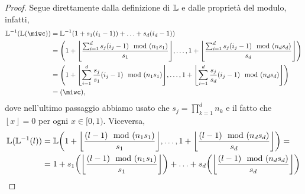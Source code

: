 \begin{proof}
Segue direttamente dalla definizione di $ \mathbb{L} $ e dalle proprietà del modulo, infatti,
\[
\begin{aligned}
  \L^{-1}(\L(\miwc)) &= \L^{-1}(1 + s_1(i_1-1)) + \ldots + s_d(i_d-1)) \\
                     &= \left( 1+ \left\lfloor \frac{\sum_{i=1}^d s_j(i_j-1) \mod(n_1s_1)}{s_1}
                     \right\rfloor, \ldots,   1+ \left\lfloor \frac{\sum_{i=1}^d s_j(i_j-1)
                   \mod(n_ds_d)}{s_d} \right\rfloor \right)\\
                     &= \left( 1+ \left\lfloor \sum_{i=1}^d \frac{s_j}{s_1}(i_j-1) \mod(n_1s_1)
                     \right\rfloor, \ldots,   1+ \left\lfloor \sum_{i=1}^d \frac{s_j}{s_d}(i_j-1)
                   \mod(n_ds_d) \right\rfloor \right)\\
                     &= \left( \miwc \right),
\end{aligned}
\]
dove nell'ultimo passaggio abbiamo usato che $ s_j = \prod_{k=1}^d n_k$ e il fatto che $
\left\lfloor x \right\rfloor = 0 $ per ogni $ x \in [0,1) $.
Viceversa,
\[
\begin{aligned}
  \L(\L^{-1}(l)) &= \L\left(1 + \left\lfloor \frac{ (l-1)\mod(n_1s_1)}{s_1}\right\rfloor, \ldots, 1 +
    \left\lfloor \frac{ (l-1)\mod(n_ds_d)}{s_d} \right\rfloor\right) = \\
                 &=1 + s_1\left(\left\lfloor \frac{(l-1) \mod(n_1s_1)}{s_1} \right\rfloor \right) + \ldots +
                 s_d\left(\left\lfloor \frac{(l-1) \mod(n_ds_d)}{s_d} \right\rfloor\right)
\end{aligned}
\] 
\end{proof}

